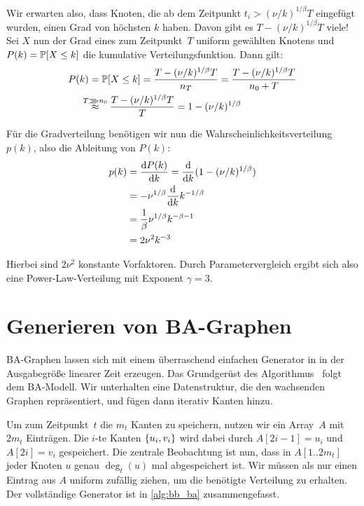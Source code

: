 Wir erwarten also, dass Knoten, die ab dem Zeitpunkt $t_i > (\nu / k)^{1/\beta} T$ eingefügt wurden, einen Grad von höchsten $k$ haben.
Davon gibt es $T - (\nu / k)^{1/\beta} T$ viele!
Sei $X$ nun der Grad eines zum Zeitpunkt~$T$ uniform gewählten Knotens und $P(k) = \mathbb{P}\!\left[X \le k\right]$ die kumulative Verteilungsfunktion.
Dann gilt:
\begin{align}
    P(k) & = \prob{X \le k} = \frac{T - (\nu / k)^{1/\beta} T}{n_T} = \frac{T - (\nu / k)^{1/\beta} T}{n_0 + T} \\
         & \stackrel{\mathclap{T \ggg n_0}}{\approx} \quad\! \frac{T - (\nu / k)^{1/\beta} T}{T} = 1 - (\nu / k)^{1/\beta}
\end{align}

Für die Gradverteilung benötigen wir nun die Wahrscheinlichkeitsverteilung $p(k)$, also die Ableitung von $P(k)$:
\begin{align}
    p(k) & = \frac{\text d P(k)}{\text d k} = \frac{\text d}{\text d k} (1 - (\nu / k)^{1/\beta}) \\
         & = - \nu ^ {1/\beta}  \frac{\text d}{\text d k} k ^{-1/\beta}                       \\
         & = \frac{1}{\beta} \nu ^{1 / \beta} k^{-\beta - 1}                              \\
         & = 2 \nu^2 k^{-3}
\end{align}

Hierbei sind $2 \nu^2$ konstante Vorfaktoren.
Durch Parametervergleich ergibt sich also eine Power-Law-Verteilung mit Exponent $\gamma = 3$.

\section{Generieren von BA-Graphen}
BA-Graphen lassen sich mit einem überraschend einfachen Generator in in der Ausgabegröße linearer Zeit erzeugen.
Das Grundgerüst des Algorithmus~\cite{batagelj2005efficient} folgt dem BA-Modell.
Wir unterhalten eine Datenstruktur, die den wachsenden Graphen repräsentiert, und fügen dann iterativ Kanten hinzu.

Um zum Zeitpunkt~$t$ die $m_t$ Kanten zu speichern, nutzen wir ein Array~$A$ mit $2m_t$ Einträgen.
Die $i$-te Kanten $\left\{u_i, v_i\right\}$ wird dabei durch $A[2i - 1] = u_i$ und $A[2i] = v_i$ gespeichert.
Die zentrale Beobachtung ist nun, dass in $A[1 .. 2m_t]$ jeder Knoten $u$ genau $\deg_t(u)$ mal abgespeichert ist.
Wir müssen als nur einen Eintrag aus $A$ uniform zufällig ziehen, um die benötigte Verteilung zu erhalten.
Der vollständige Generator ist in \cref{alg:bb_ba} zusammengefasst.


